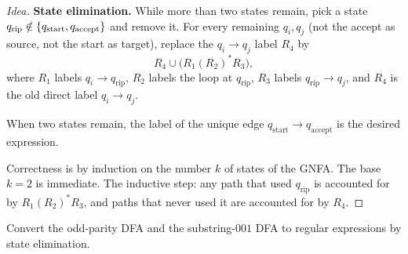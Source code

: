 \begin{proof}[Idea]
\textbf{State elimination.} While more than two states remain, pick a state
$q_{\mathrm{rip}}\notin\{q_{\mathrm{start}},q_{\mathrm{accept}}\}$ and remove
it. For every remaining $q_i,q_j$ (not the accept as source, not the start as
target), replace the $q_i\to q_j$ label $R_4$ by
\[
  R_4\cup\bigl(R_1(R_2)^*R_3\bigr),
\]
where $R_1$ labels $q_i\to q_{\mathrm{rip}}$, $R_2$ labels the loop at
$q_{\mathrm{rip}}$, $R_3$ labels $q_{\mathrm{rip}}\to q_j$, and $R_4$ is the old
direct label $q_i\to q_j$.

When two states remain, the label of the unique edge
$q_{\mathrm{start}}\to q_{\mathrm{accept}}$ is the desired expression.

Correctness is by induction on the number $k$ of states of the GNFA. The base
$k=2$ is immediate. The inductive step: any path
that used $q_{\mathrm{rip}}$ is accounted for by $R_1(R_2)^*R_3$, and paths
that never used it are accounted for by $R_4$.
\end{proof}

\begin{exercise}
Convert the odd-parity DFA and the substring-$001$ DFA to regular
expressions by state elimination.
\end{exercise}
